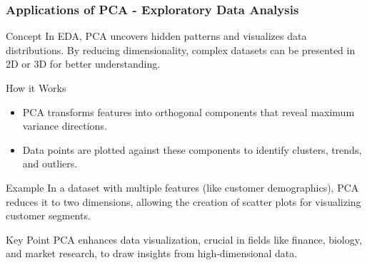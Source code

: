\documentclass[aspectratio=169]{beamer}
\begin{document}
\begin{frame}[fragile]
    \frametitle{Applications of PCA - Exploratory Data Analysis}
    \begin{block}{Concept}
        In EDA, PCA uncovers hidden patterns and visualizes data distributions. By reducing dimensionality, complex datasets can be presented in 2D or 3D for better understanding.
    \end{block}
    
    \begin{block}{How it Works}
        \begin{itemize}
            \item PCA transforms features into orthogonal components that reveal maximum variance directions.
            \item Data points are plotted against these components to identify clusters, trends, and outliers.
        \end{itemize}
    \end{block}
    
    \begin{block}{Example}
        In a dataset with multiple features (like customer demographics), PCA reduces it to two dimensions, allowing the creation of scatter plots for visualizing customer segments.
    \end{block}

    \begin{block}{Key Point}
        PCA enhances data visualization, crucial in fields like finance, biology, and market research, to draw insights from high-dimensional data.
    \end{block}
\end{frame}
\end{document}
